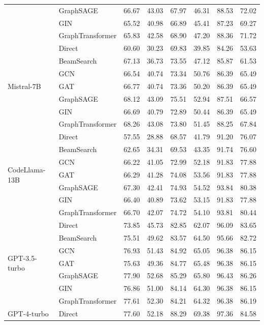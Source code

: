 \documentclass[11pt,UTF8,fontset=fandol]{ctexart}
\begin{document}
\begin{table}[H]
\begin{tabular}{llcc cc cc}
& GraphSAGE & 66.67 & 43.03 & 67.97 & 46.31 & 88.53 & 72.02\\
& GIN & 65.52 & 40.98 & 66.89 & 45.41 & 87.23 & 69.27\\
& GraphTransformer & 65.83 & 42.58 & 68.90 & 47.20 & 88.36 & 71.72\\
\midrule
\multirow{7}{*}{Mistral-7B}
& Direct & 60.60 & 30.23 & 69.83 & 39.85 & 84.26 & 53.63\\
& BeamSearch & 67.13 & 36.73 & 73.55 & 47.12 & 85.87 & 61.53\\
& GCN & 66.54 & 40.74 & 73.34 & 50.76 & 86.39 & 65.49\\
& GAT & 66.77 & 40.74 & 73.36 & 50.20 & 86.39 & 65.49\\
& GraphSAGE & 68.12 & 43.09 & 75.51 & 52.94 & 87.51 & 66.57\\
& GIN & 66.69 & 40.79 & 72.89 & 50.44 & 86.39 & 65.49\\
& GraphTransformer & 68.26 & 43.08 & 73.80 & 51.45 & 88.25 & 67.84\\
\midrule
\multirow{7}{*}{CodeLlama-13B}
& Direct & 57.55 & 28.88 & 68.57 & 41.79 & 91.20 & 76.07\\
& BeamSearch & 62.65 & 34.31 & 69.53 & 43.35 & 91.74 & 76.60\\
& GCN & 66.22 & 41.05 & 72.99 & 52.18 & 91.83 & 77.88\\
& GAT & 66.29 & 41.28 & 74.08 & 53.56 & 91.83 & 77.88\\
& GraphSAGE & 67.30 & 42.41 & 74.93 & 54.52 & 93.84 & 80.38\\
& GIN & 66.40 & 40.89 & 73.62 & 53.15 & 91.83 & 77.88\\
& GraphTransformer & 66.70 & 42.07 & 74.72 & 54.10 & 93.81 & 80.44\\
\midrule
\multirow{7}{*}{GPT-3.5-turbo}
& Direct & 73.85 & 45.73 & 82.85 & 62.07 & 96.09 & 83.65\\
& BeamSearch & 75.51 & 49.62 & 83.57 & 64.50 & 95.66 & 82.72\\
& GCN & 76.93 & 51.43 & 84.92 & 65.05 & 96.38 & 86.15\\
& GAT & 75.63 & 49.36 & 84.77 & 65.48 & 96.38 & 86.15\\
& GraphSAGE & 77.90 & 52.68 & 85.29 & 65.80 & 96.43 & 86.26\\
& GIN & 76.86 & 51.00 & 84.14 & 64.30 & 96.38 & 86.15\\
& GraphTransformer & 77.61 & 52.30 & 84.21 & 64.32 & 96.38 & 86.19\\
\midrule
\multirow{7}{*}{GPT-4-turbo}
& Direct & 77.60 & 52.18 & 88.29 & 69.38 & 97.36 & 84.58\\

\end{tabular}
\end{table}
\end{document}

